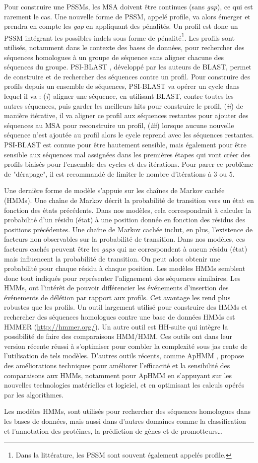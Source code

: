 Pour construire une PSSMs, les MSA doivent être continues (sans \textit{gap}), ce qui est rarement le cas. Une nouvelle forme de PSSM, appelé profile, va alors émerger et prendra en compte les \textit{gap} en appliquant des pénalités. Un profil est donc un PSSM intégrant les possibles indels sous forme de pénalité\footnote{Dans la littérature, les PSSM sont souvent également appelés profile.}. Les profils sont utilisés, notamment dans le contexte des bases de données, pour rechercher des séquences homologues à un groupe de séquence sans aligner chacune des séquences du groupe. PSI-BLAST \cite{altschul_gapped_1997}, développé par les auteurs de BLAST, permet de construire et de rechercher des séquences contre un profil. Pour construire des profils depuis un ensemble de séquences, PSI-BLAST va opérer un cycle dans lequel il va : (\textit{i}) aligner une séquence, en utilisant BLAST, contre toutes les autres séquences, puis garder les meilleurs hits pour construire le profil, (\textit{ii}) de manière itérative, il va aligner ce profil aux séquences restantes pour ajouter des séquences au MSA pour reconstruire un profil, (\textit{iii}) lorsque aucune nouvelle séquence n'est ajoutée au profil alors le cycle reprend avec les séquences restantes. PSI-BLAST est connue pour être hautement sensible, mais également pour être sensible aux séquences mal assignées dans les premières étapes qui vont créer des profils biaisés pour l'ensemble des cycles et des itérations. Pour parer ce problème de "dérapage", il est recommandé de limiter le nombre d'itérations à 3 ou 5.

Une dernière forme de modèle s'appuie sur les chaînes de Markov cachée (HMMs). Une chaîne de Markov décrit la probabilité de transition vers un état en fonction des états précédents. Dans nos modèles, cela correspondrait à calculer la probabilité d'un résidu (état) à une position donnée en fonction des résidus des positions précédentes. Une chaîne de Markov cachée inclut, en plus, l'existence de facteurs non observables sur la probabilité de transition. Dans nos modèles, ces facteurs cachés peuvent être les \textit{gaps} qui ne correspondent à aucun résidu (état) mais influencent la probabilité de transition. On peut alors obtenir une probabilité pour chaque résidu à chaque position. Les modèles HMMs semblent donc tout indiqués pour représenter l'alignement des séquences similaires. Les HMMs, ont l'intérêt de pouvoir différencier les événements d'insertion des événements de délétion par rapport aux profils. Cet avantage les rend plus robustes que les profils. Un outil largement utilisé pour construire des HMMs et rechercher des séquences homologues contre une base de données HMMs est HMMER (\url{http://hmmer.org/}). Un autre outil est HH-suite \cite{steinegger_hh-suite3_2019} qui intègre la possibilité de faire des comparaisons HMM/HMM. Ces outils ont dans leur version récente réussi à s'optimiser pour combler la complexité sous jas cente de l'utilisation de tels modèles. D'autres outils récents, comme ApHMM \cite{firtina_aphmm_2024}, propose des améliorations techniques pour améliorer l'efficacité et la sensibilité des comparaisons aux HMMs, notamment pour ApHMM en s'appuyant sur les nouvelles technologies matérielles et logiciel, et en optimisant les calculs opérés par les algorithmes.

Les modèles HMMs, sont utilisés pour rechercher des séquences homologues dans les bases de données, mais aussi dans d'autres domaines \cite{dimri_hidden_2024} comme la classification et l'annotation des protéines, la prédiction de gènes et de promotteurs\dots
